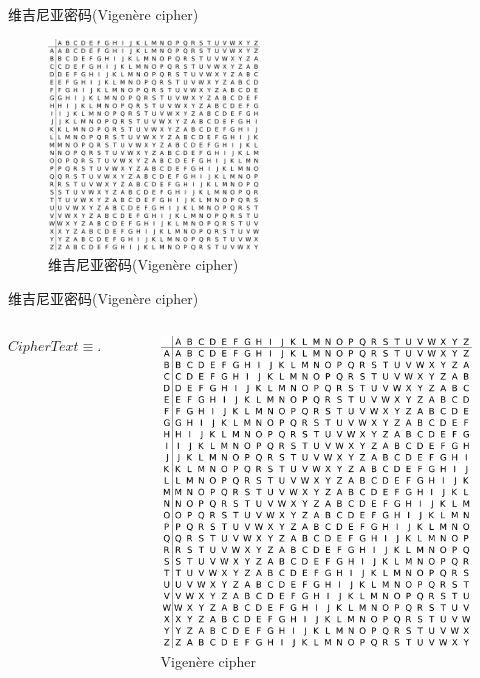 \documentclass[UTF8]{ctexbeamer}
\begin{document}
\begin{frame}{维吉尼亚密码(Vigenère cipher)}
        
    \begin{figure}
        \centering
        \includegraphics[width=0.5\textwidth]{vigenere.png}
        \caption{维吉尼亚密码(Vigenère cipher)}
    \end{figure}
        
\end{frame}
\begin{frame}{维吉尼亚密码(Vigenère cipher)}
    \begin{columns}
        \begin{column}{0.7\textwidth}
            \centering
            $CipherText \equiv PlainText + Key (\text{mod} 26)$
        \end{column}
        \begin{column}{0.3\textwidth}
            \begin{figure}
                \centering
                \includegraphics[width=\textwidth]{vigenere.png}
                \caption{Vigenère cipher}
            \end{figure}
        \end{column}
    \end{columns}
\end{frame}
\end{document}
